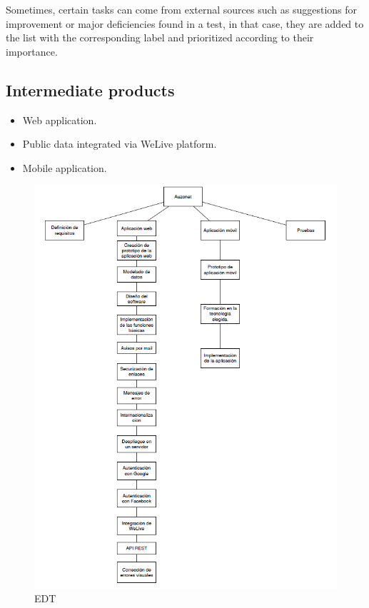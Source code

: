 \documentclass{DeustoFDP}
\begin{document}
Sometimes, certain tasks can come from external sources such as suggestions for improvement or major deficiencies found in a test, in that case, they are added to the list with the corresponding label and prioritized according to their importance.
\subsection{Intermediate products}
\begin{itemize}
	\item Web application.
	\item Public data integrated via WeLive platform.
	\item Mobile application.
\end{itemize}
\newpage
\begin{figure}[H]
	\centering
	\includegraphics{fig/EDT}
	\caption{EDT}\label{fig:edt}
\end{figure}
\end{document}
